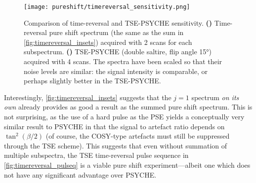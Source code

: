 \begin{figure}[htb]
    \centering
    \texttt{[image: pureshift/timereversal\_sensitivity.png]}
    {\label{fig:timereversal_sensitivity_tr}}
    {\label{fig:timereversal_sensitivity_tsepsyche}}
    \caption[Comparison of time-reversal and TSE-PSYCHE sensitivity]{
        Comparison of time-reversal and TSE-PSYCHE sensitivity.
        \textbf{()} Time-reversal pure shift spectrum (the same as the sum in \cref{fig:timereversal_insets}) acquired with 2 scans for each subspectrum.
        \textbf{()} TSE-PSYCHE (double saltire, flip angle \ang{15}) acquired with 4 scans.
        The spectra have been scaled so that their noise levels are similar: the signal intensity is comparable, or perhaps slightly better in the TSE-PSYCHE.
    }
    \label{fig:timereversal_sensitivity}
\end{figure}

Interestingly, \cref{fig:timereversal_insets} suggests that the $j = 1$ spectrum \textit{on its own} already provides as good a result as the summed pure shift spectrum.
This is not surprising, as the use of a hard pulse as the PSE yields a conceptually very similar result to PSYCHE in that the signal to artefact ratio depends on $\tan^2(\beta/2)$ (of course, the COSY-type artefacts must still be suppressed through the TSE scheme).
This suggests that even without summation of multiple subspectra, the TSE time-reversal pulse sequence in \cref{fig:timereversal_pulseq} is a viable pure shift experiment---albeit one which does not have any significant advantage over PSYCHE.
